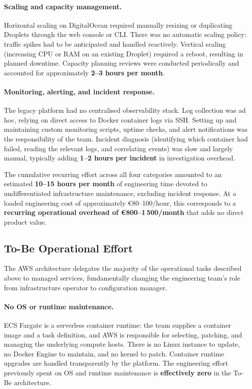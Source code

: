 \paragraph{Scaling and capacity management.}
Horizontal scaling on DigitalOcean required manually resizing or
duplicating Droplets through the web console or CLI.
There was no automatic scaling policy: traffic spikes had to be
anticipated and handled reactively.
Vertical scaling (increasing CPU or RAM on an existing Droplet)
required a reboot, resulting in planned downtime.
Capacity planning reviews were conducted periodically and accounted
for approximately \textbf{2--3 hours per month}.

\paragraph{Monitoring, alerting, and incident response.}
The legacy platform had no centralised observability stack.
Log collection was ad hoc, relying on direct access to Docker container
logs via SSH.
Setting up and maintaining custom monitoring scripts, uptime checks,
and alert notifications was the responsibility of the team.
Incident diagnosis (identifying which container had failed, reading
the relevant logs, and correlating events) was slow and largely
manual, typically adding \textbf{1--2 hours per incident} in
investigation overhead.

The cumulative recurring effort across all four categories amounted to
an estimated \textbf{10--15 hours per month} of engineering time
devoted to undifferentiated infrastructure maintenance, excluding
incident response.
At a loaded engineering cost of approximately €80--100/hour, this
corresponds to a \textbf{recurring operational overhead of
€800--1\,500/month} that adds no direct product value.

\subsection{To-Be Operational Effort}

The AWS architecture delegates the majority of the operational tasks
described above to managed services, fundamentally changing the
engineering team's role from infrastructure operator to configuration
manager.

\paragraph{No OS or runtime maintenance.}
ECS Fargate is a serverless container runtime: the team supplies a
container image and a task definition, and AWS is responsible for
selecting, patching, and managing the underlying compute hosts.
There is no Linux instance to update, no Docker Engine to maintain,
and no kernel to patch.
Container runtime upgrades are handled transparently by the platform.
The engineering effort previously spent on OS and runtime maintenance
is \textbf{effectively zero} in the To-Be architecture.

